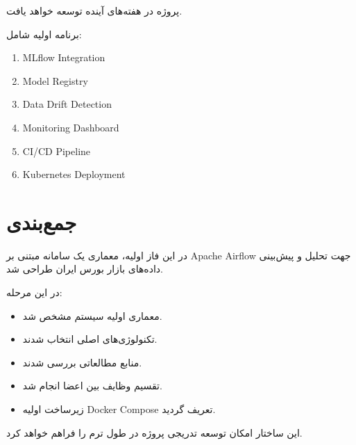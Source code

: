 \documentclass[12pt,a4paper]{article}
\begin{document}
پروژه در هفته‌های آینده توسعه خواهد یافت.

برنامه اولیه شامل:

\begin{enumerate}
\item MLflow Integration
\item Model Registry
\item Data Drift Detection
\item Monitoring Dashboard
\item CI/CD Pipeline
\item Kubernetes Deployment
\end{enumerate}


\section{جمع‌بندی}

در این فاز اولیه، معماری یک سامانه  مبتنی بر Apache Airflow جهت تحلیل و پیش‌بینی داده‌های بازار بورس ایران طراحی شد.

در این مرحله:

\begin{itemize}
\item معماری اولیه سیستم مشخص شد.
\item تکنولوژی‌های اصلی انتخاب شدند.
\item منابع مطالعاتی بررسی شدند.
\item تقسیم وظایف بین اعضا انجام شد.
\item زیرساخت اولیه Docker Compose تعریف گردید.
\end{itemize}

این ساختار امکان توسعه تدریجی پروژه در طول ترم را فراهم خواهد کرد.
\end{document}
